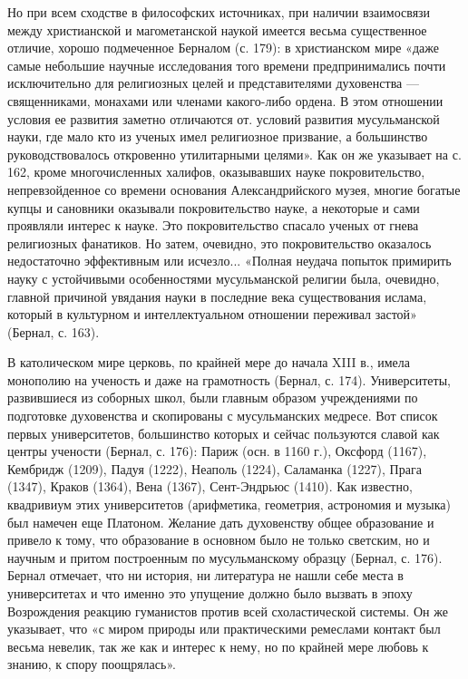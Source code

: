 Но   при  всем   сходстве  в   философских  источниках,   при  наличии
взаимосвязи между  христианской и магометанской наукой  имеется весьма
существенное  отличие,   хорошо  подмеченное  Берналом  (с.   179):  в
христианском  мире «даже  самые  небольшие  научные исследования  того
времени предпринимались  почти исключительно  для религиозных  целей и
представителями  духовенства ---  священниками,  монахами или  членами
какого-либо  ордена.  В этом  отношении  условия  ее развития  заметно
отличаются от. условий  развития мусульманской науки, где  мало кто из
ученых  имел религиозное  призвание,  а большинство  руководствовалось
откровенно  утилитарными  целями». Как  он  же  указывает на  с.  162,
кроме  многочисленных  халифов,   оказывавших  науке  покровительство,
непревзойденное  со времени  основания Александрийского  музея, многие
богатые купцы и сановники оказывали покровительство науке, а некоторые
и  сами  проявляли  интерес   к  науке.  Это  покровительство  спасало
ученых  от  гнева  религиозных  фанатиков.  Но  затем,  очевидно,  это
покровительство  оказалось  недостаточно  эффективным  или  исчезло...
«Полная неудача  попыток примирить  науку с  устойчивыми особенностями
мусульманской религии была, очевидно,  главной причиной увядания науки
в  последние  века  существования   ислама,  который  в  культурном  и
интеллектуальном отношении переживал застой» (Бернал, с. 163).

В католическом мире церковь, по крайней  мере до начала XIII в., имела
монополию  на  ученость  и  даже  на  грамотность  (Бернал,  с.  174).
Университеты,  развившиеся  из  соборных школ,  были  главным  образом
учреждениями по  подготовке духовенства и скопированы  с мусульманских
медресе. Вот список первых университетов, большинство которых и сейчас
пользуются славой как центры учености  (Бернал, с. 176): Париж (осн. в
1160  г.),  Оксфорд (1167),  Кембридж  (1209),  Падуя (1222),  Неаполь
(1224), Саламанка  (1227), Прага  (1347), Краков (1364),  Вена (1367),
Сент-Эндрьюс  (1410).  Как  известно,  квадривиум  этих  университетов
(арифметика, геометрия, астрономия и музыка) был намечен еще Платоном.
Желание  дать духовенству  общее  образование и  привело  к тому,  что
образование  в  основном было  не  только  светским,  но и  научным  и
притом построенным по мусульманскому  образцу (Бернал, с. 176). Бернал
отмечает,  что  ни  история,  ни  литература не  нашли  себе  места  в
университетах и  что именно это  упущение должно было вызвать  в эпоху
Возрождения реакцию гуманистов против  всей схоластической системы. Он
же указывает, что «с миром природы или практическими ремеслами контакт
был весьма невелик,  так же как и  интерес к нему, но  по крайней мере
любовь к знанию, к спору поощрялась».

